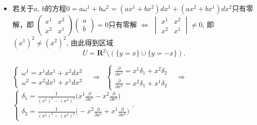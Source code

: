 \begin {itemize}
	\item[37.] 
    若关于$a$, $b$的方程$0=a\omega^1+b\omega^2=(ax^1+bx^2)dx^1+(ax^2+bx^1)dx^2$只有零解，即
	$\begin{pmatrix}
		x^1& x^2\\
		x^2& x^1
	\end{pmatrix}
	\begin{pmatrix}
		a\\
		b
	\end{pmatrix}=0$只有零解 $\iff$  $\begin{vmatrix}
		x^1& x^2\\
		x^2& x^1
	\end{vmatrix}\neq0$, 即$(x^1)^2\neq(x^2)^2$, 
	由此得到区域$$U=\mathbf{R}^2\setminus (\{y=x\}\cup \{y=-x\}).$$
	
	$\begin{cases}
	\omega^1=x^1dx^1+x^2dx^2\\
	\omega^2=x^2dx^1+x^1dx^2
	\end{cases}$
	\ $\Rightarrow$\ 
	$\begin{cases}
	\frac{\partial}{\partial x^1}=x^1\delta_1+x^2\delta_2\\
	\frac{\partial}{\partial x^2}=x^2\delta_1+x^1\delta_2
	\end{cases}$
	\ $\Rightarrow$\ 
	$\begin{cases}
	\delta_1=\frac{1}{(x^1)^2-(x^2)^2}\big(x^1\frac{\partial}{\partial x^1}-x^2\frac{\partial}{\partial x^2}\big)\\
	\delta_2=\frac{1}{(x^1)^2-(x^2)^2}\big(-x^2\frac{\partial}{\partial x^1}+x^1\frac{\partial}{\partial x^2}\big)
	\end{cases}.$
	


\end{itemize}
